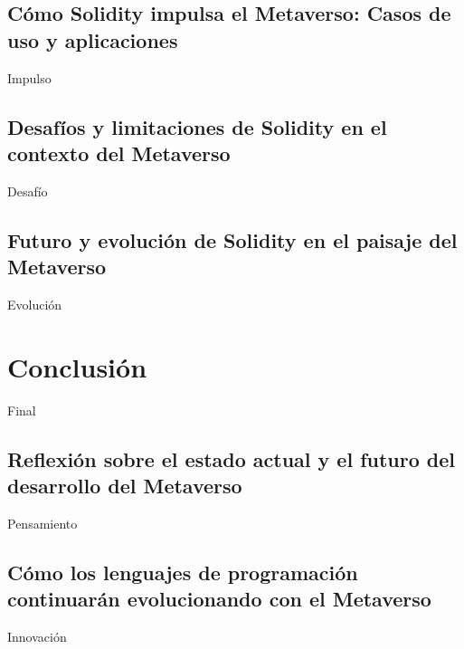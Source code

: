 \documentclass[a4paper,10pt]{article}
\begin{document}
	\subsection{Cómo Solidity impulsa el Metaverso: Casos de uso y aplicaciones}
	Impulso
	\subsection{Desafíos y limitaciones de Solidity en el contexto del Metaverso}
	Desafío
	\subsection{Futuro y evolución de Solidity en el paisaje del Metaverso}
	Evolución
	
	\section{Conclusión}
	Final
	\subsection{Reflexión sobre el estado actual y el futuro del desarrollo del Metaverso}
	Pensamiento
	\subsection{Cómo los lenguajes de programación continuarán evolucionando con el Metaverso}
	Innovación
	
	\nocite{*}
	\printbibliography[heading=bibintoc]
\end{document}
